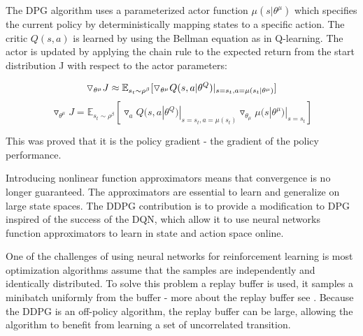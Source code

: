 The DPG algorithm uses a parameterized actor function $\mu(s|\theta^\mu)$ which specifies the current policy by deterministically mapping states to a specific action. The critic $Q(s,a)$ is learned by using the Bellman equation as in Q-learning. The actor is updated by applying the chain rule to the expected return from the start distribution J with respect to the actor parameters: 
 
\begin{equation}
\triangledown_{\theta^\mu} J \approx \mathbb{E}_{s_t \sim \rho^\beta} [\triangledown_{\theta^\mu}Q(s,a|\theta^Q)|_{s=s_t , a=\mu(s_t|\theta^\mu)}]  
\newline
\end{equation}
\begin{equation}
\triangledown_{\theta^\mu} J = \mathbb{E}_{s_t \sim \rho^\beta} [\triangledown_{a}Q(s,a|\theta^Q)|_{s=s_t , a=\mu(s_t)} \triangledown_{\theta_\mu}\mu(s|\theta^\mu)|_{s=s_t} ]
\end{equation} 

This was proved that it is the policy gradient - the gradient of the policy performance. 

Introducing nonlinear function approximators means that convergence is no longer guaranteed. The approximators are essential to learn and generalize on large state spaces. The DDPG contribution is to provide a modification to DPG inspired of the success of the DQN, which allow it to use neural networks function approximators to learn in state and action space online.  

One of the challenges of using neural networks for reinforcement learning is most optimization algorithms assume that the samples are independently and identically distributed. To solve this problem a replay buffer is used, it samples a minibatch uniformly from the buffer - more about the replay buffer see . Because the DDPG is an off-policy algorithm, the replay buffer can be large, allowing the algorithm to benefit from learning a set of uncorrelated transition.


